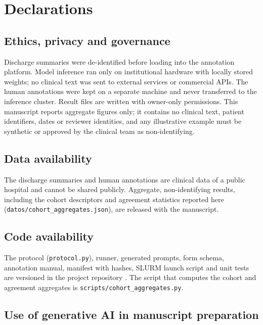 \section*{Declarations}

\subsection*{Ethics, privacy and governance}\label{sec:ethics}
 Discharge summaries were
de-identified before loading into the annotation platform. Model inference ran only on institutional hardware with
locally stored weights; no clinical text was sent to external services or commercial APIs. The human annotations
were kept on a separate machine and never transferred to the inference cluster. Result files are written with
owner-only permissions. This manuscript reports aggregate figures only; it contains no clinical text, patient
identifiers, dates or reviewer identities, and any illustrative example must be synthetic or approved by the
clinical team as non-identifying.

\subsection*{Data availability}
The discharge summaries and human annotations are clinical data of a public hospital and cannot be shared publicly.
Aggregate, non-identifying results, including the cohort descriptors and agreement statistics reported here
(\texttt{datos/cohort\_aggregates.json}), are released with the manuscript.

\subsection*{Code availability}
The protocol (\texttt{protocol.py}), runner, generated prompts, form schema, annotation manual, manifest with hashes,
SLURM launch script and unit tests are versioned in the project repository
. The script that computes the cohort and agreement
aggregates is \texttt{scripts/cohort\_aggregates.py}.

\subsection*{Use of generative AI in manuscript preparation}

